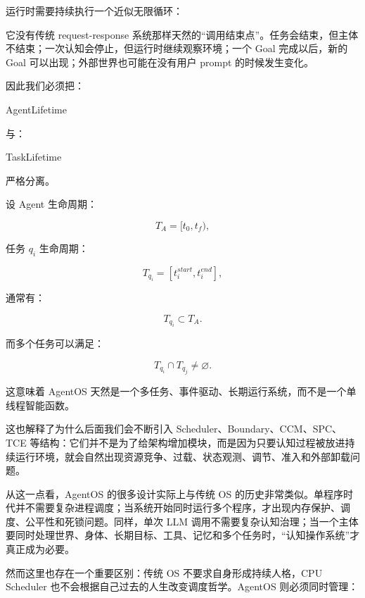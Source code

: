 运行时需要持续执行一个近似无限循环：

\begin{statementbox}
\centering
{}
\end{statementbox}

它没有传统 request-response 系统那样天然的“调用结束点”。任务会结束，但主体不结束；一次认知会停止，但运行时继续观察环境；一个 Goal 完成以后，新的 Goal 可以出现；外部世界也可能在没有用户 prompt 的时候发生变化。

因此我们必须把：

\begin{statementbox}
AgentLifetime
\end{statementbox}

与：

\begin{statementbox}
TaskLifetime
\end{statementbox}

严格分离。

设 Agent 生命周期：

\[
T_A=[t_0,t_f),
\]

任务 $q_i$ 生命周期：

\[
T_{q_i}=[t_i^{start},t_i^{end}],
\]

通常有：

\[
T_{q_i}\subset T_A.
\]

而多个任务可以满足：

\[
T_{q_i}\cap T_{q_j}\neq\varnothing.
\]

这意味着 AgentOS 天然是一个多任务、事件驱动、长期运行系统，而不是一个单线程智能函数。

这也解释了为什么后面我们会不断引入 Scheduler、Boundary、CCM、SPC、TCE 等结构：它们并不是为了给架构增加模块，而是因为只要认知过程被放进持续运行环境，就会自然出现资源竞争、过载、状态观测、调节、准入和外部卸载问题。

从这一点看，AgentOS 的很多设计实际上与传统 OS 的历史非常类似。单程序时代并不需要复杂进程调度；当系统开始同时运行多个程序，才出现内存保护、调度、公平性和死锁问题。同样，单次 LLM 调用不需要复杂认知治理；当一个主体要同时处理世界、身体、长期目标、工具、记忆和多个任务时，“认知操作系统”才真正成为必要。

然而这里也存在一个重要区别：传统 OS 不要求自身形成持续人格，CPU Scheduler 也不会根据自己过去的人生改变调度哲学。AgentOS 则必须同时管理：

